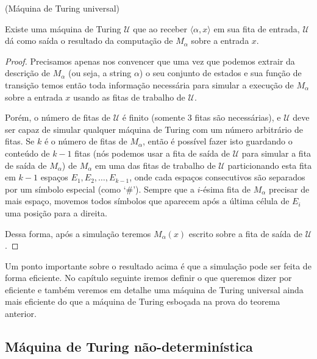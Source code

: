 \begin{teo}(Máquina de Turing universal) \label{teo:MTuni1}

Existe uma máquina de Turing $\mathcal{U}$ que ao receber $\langle \alpha, x \rangle$ em sua fita de entrada, $\mathcal{U}$ dá como saída o resultado da computação de $M_{\alpha}$ sobre a entrada $x$.

\end{teo}

\begin{proof}

Precisamos apenas nos convencer que uma vez que podemos extrair da descrição de $M_{\alpha}$ (ou seja, a string $\alpha$) o seu conjunto de estados e sua função de transição temos então toda informação necessária para simular a execução de $M_{\alpha}$ sobre a entrada $x$ usando as fitas de trabalho de $\mathcal{U}$. 

Porém, o número de fitas de $\mathcal{U}$ é finito (somente 3 fitas são necessárias), e $\mathcal{U}$ deve ser capaz de simular qualquer máquina de Turing com um número arbitrário de fitas. Se $k$ é o número de fitas de $M_{\alpha}$, então é possível fazer isto guardando o conteúdo de $k - 1$ fitas (nós podemos usar a fita de saída de $\mathcal{U}$ para simular a fita de saída de $M_{\alpha}$) de $M_{\alpha}$ em uma das fitas de trabalho de $\mathcal{U}$ particionando esta fita em $k - 1$ espaços $E_{1}, E_{2}, \dots, E_{k - 1}$, onde cada espaços consecutivos são separados por um símbolo especial (como $\text{`}\#\text{'}$). Sempre que a $i$-ésima fita de $M_{\alpha}$ precisar de mais espaço, movemos todos símbolos que aparecem após a última célula de $E_{i}$ uma posição para a direita.

Dessa forma, após a simulação teremos $M_{\alpha}(x)$ escrito sobre a fita de saída de $\mathcal{U}$.

\end{proof}

Um ponto importante sobre o resultado acima é que a simulação pode ser feita de forma eficiente. No capítulo seguinte iremos definir o que queremos dizer por eficiente e também veremos em detalhe uma máquina de Turing universal ainda mais eficiente do que a máquina de Turing esboçada na prova do teorema anterior.


\subsection{Máquina de Turing não-determinística}

